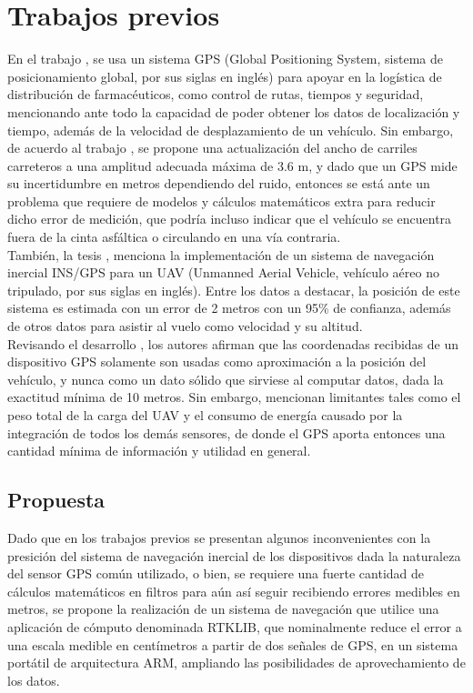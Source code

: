 \section{Trabajos previos}
En el trabajo \cite{de2011diseno}, se usa un sistema GPS (Global Positioning System, sistema de posicionamiento global, por sus siglas en inglés) para apoyar en la logística de distribución de farmacéuticos, como control de rutas, tiempos y seguridad, mencionando ante todo la capacidad de poder obtener los datos de localización y tiempo, además de la velocidad de desplazamiento de un vehículo. Sin embargo, de acuerdo al trabajo \cite{mendoza2004recomendaciones}, se propone una actualización del ancho de carriles carreteros a una amplitud adecuada máxima de 3.6 m, y dado que un GPS mide su incertidumbre en metros dependiendo del ruido, entonces se está ante un problema que requiere de modelos y cálculos matemáticos extra para reducir dicho error de medición, que podría incluso indicar que el vehículo se encuentra fuera de la cinta asfáltica o circulando en una vía contraria. \\

También, la tesis \cite{ronnback2000developement}, menciona la implementación de un sistema de navegación inercial INS/GPS para un UAV (Unmanned Aerial Vehicle, vehículo aéreo no tripulado, por sus siglas en inglés). Entre los datos a destacar, la posición de este sistema es estimada con un error de 2 metros con un 95\% de confianza, además de otros datos para asistir al vuelo como velocidad y su altitud. \\

Revisando el desarrollo \cite{maldonado2010controlador}, los autores afirman que las coordenadas recibidas de un dispositivo GPS solamente son usadas como aproximación a la posición del vehículo, y nunca como un dato sólido que sirviese al computar datos, dada la exactitud mínima de 10 metros. Sin embargo, mencionan limitantes tales como el peso total de la carga del UAV y el consumo de energía causado por la integración de todos los demás sensores, de donde el GPS aporta entonces una cantidad mínima de información y utilidad en general. \\


\subsection{Propuesta}
Dado que en los trabajos previos se presentan algunos inconvenientes con la presición del sistema de navegación inercial de los dispositivos dada la naturaleza del sensor GPS común utilizado, o bien, se requiere una fuerte cantidad de cálculos matemáticos en filtros para aún así seguir recibiendo errores medibles en metros, se propone la realización de un sistema de navegación que utilice una aplicación de cómputo denominada RTKLIB, que nominalmente reduce el error a una escala medible en centímetros a partir de dos señales de GPS, en un sistema portátil de arquitectura ARM, ampliando las posibilidades de aprovechamiento de los datos.

